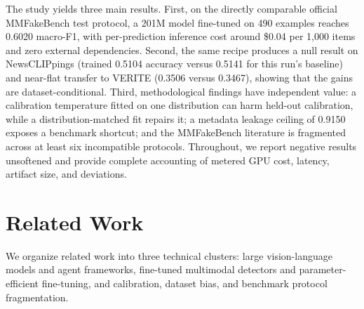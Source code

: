 \documentclass{article} %
\begin{document}
The study yields three main results. First, on the directly comparable official MMFakeBench test protocol, a 201M model fine-tuned on 490 examples reaches 0.6020 macro-F1, with per-prediction inference cost around \$0.04 per 1,000 items and zero external dependencies. Second, the same recipe produces a null result on NewsCLIPpings (trained 0.5104 accuracy versus 0.5141 for this run's baseline) and near-flat transfer to VERITE (0.3506 versus 0.3467), showing that the gains are dataset-conditional. Third, methodological findings have independent value: a calibration temperature fitted on one distribution can harm held-out calibration, while a distribution-matched fit repairs it; a metadata leakage ceiling of 0.9150 exposes a benchmark shortcut; and the MMFakeBench literature is fragmented across at least six incompatible protocols. Throughout, we report negative results unsoftened and provide complete accounting of metered GPU cost, latency, artifact size, and deviations.

\section{Related Work}
\label{sec:related_work}
We organize related work into three technical clusters: large vision-language models and agent frameworks, fine-tuned multimodal detectors and parameter-efficient fine-tuning, and calibration, dataset bias, and benchmark protocol fragmentation.
\end{document}
